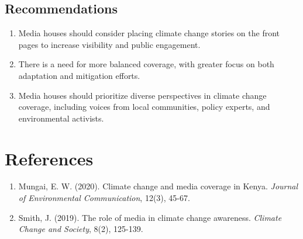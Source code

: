 \documentclass[12pt]{report}
\begin{document}
\section{Recommendations}
    \begin{enumerate}
        \item Media houses should consider placing climate change stories on the front pages to increase visibility and public engagement.
        \item There is a need for more balanced coverage, with greater focus on both adaptation and mitigation efforts.
        \item Media houses should prioritize diverse perspectives in climate change coverage, including voices from local communities, policy experts, and environmental activists.
    \end{enumerate}

\chapter{References}
    \begin{enumerate}
        \item Mungai, E. W. (2020). Climate change and media coverage in Kenya. \textit{Journal of Environmental Communication}, 12(3), 45-67.
        \item Smith, J. (2019). The role of media in climate change awareness. \textit{Climate Change and Society}, 8(2), 125-139.
    \end{enumerate}
\end{document}
